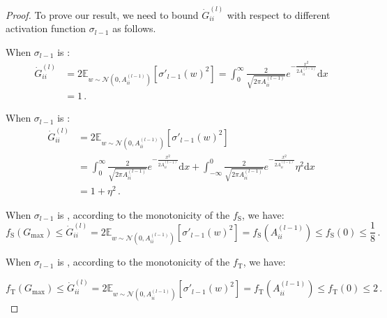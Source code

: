 \documentclass[nohyperref]{article}
\theoremstyle{plain}
\theoremstyle{definition}
\theoremstyle{remark}
\begin{document}
\begin{proof}

To prove our result, we need to bound $\dot{G}^{(l)}_{ii}$ with respect to different activation function $\sigma_{l-1}$ as follows.

When $\sigma_{l-1}$ is :
\begin{equation}
\begin{split}
    \dot{G}_{ii}^{(l)}&=2\mathbb{E}_{w \sim \mathcal N(0,A_{ii}^{(l-1)})}[{\sigma}'_{l-1}(w)^2] =\int_{0}^{\infty}\frac{2}{\sqrt{2\pi A_{ii}^{(l-1)}}}e^{-\frac{x^2}{2A_{ii}^{(l-1)}}} \mathrm{d}x\\
    &=1\,.
\end{split}
\label{eq:dotGii_RelU}
\end{equation}

When $\sigma_{l-1}$ is :
\begin{equation}
\begin{split}
    \dot{G}_{ii}^{(l)}&=2\mathbb{E}_{w \sim \mathcal N(0,A_{ii}^{(l-1)})}[{\sigma}'_{l-1}(w)^2] \\
    &=\int_{0}^{\infty}\frac{2}{\sqrt{2\pi A_{ii}^{(l-1)}}}e^{-\frac{x^2}{2A_{ii}^{(l-1)}}} \mathrm{d}x +\int_{-\infty}^{0}\frac{2}{\sqrt{2\pi A_{ii}^{(l-1)}}}e^{-\frac{x^2}{2A_{ii}^{(l-1)}}} \eta^2 \mathrm{d}x\\
    &=1+\eta^2\,.
\end{split}
\label{eq:dotGii_LeakyReLU}
\end{equation}

When $\sigma_{l-1}$ is , according to the monotonicity of the $f_{\mathrm{S}}$, we have:
\begin{equation}
f_{\mathrm{S}}(G_{\max})\leq\dot{G}_{ii}^{(l)}=2\mathbb{E}_{w \sim \mathcal N(0,A_{ii}^{(l-1)})}[{\sigma}'_{l-1}(w)^2] =f_{\mathrm{S}}(A_{ii}^{(l-1)})\leq f_{\mathrm{S}}(0) \leq \frac{1}{8}\,.
\label{eq:dotGii_Sigmoid_1}
\end{equation}

When $\sigma_{l-1}$ is , according to the monotonicity of the $f_{\mathrm{T}}$, we have:

\begin{equation}
f_{\mathrm{T}}(G_{\max})\leq\dot{G}_{ii}^{(l)}=2\mathbb{E}_{w \sim \mathcal N(0,A_{ii}^{(l-1)})}[{\sigma}'_{l-1}(w)^2] =f_{\mathrm{T}}(A_{ii}^{(l-1)})\leq f_{\mathrm{T}}(0)\leq 2\,.
\label{eq:dotGii_Tanh_1}
\end{equation}


\end{proof}
\end{document}
